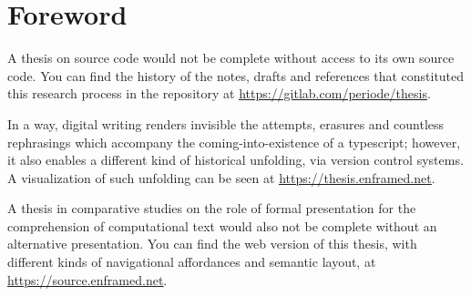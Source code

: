 \section*{Foreword}

A thesis on source code would not be complete without access to its own source code. You can find the history of the notes, drafts and references that constituted this research process in the repository at \underline{\url{https://gitlab.com/periode/thesis}}.

\spacersmall

In a way, digital writing renders invisible the attempts, erasures and countless rephrasings which accompany the coming-into-existence of a typescript; however, it also enables a different kind of historical unfolding, via version control systems. A visualization of such unfolding can be seen at \underline{\url{https://thesis.enframed.net}}.

\spacersmall

A thesis in comparative studies on the role of formal presentation for the comprehension of computational text would also not be complete without an alternative presentation. You can find the web version of this thesis, with different kinds of navigational affordances and semantic layout, at \underline{\url{https://source.enframed.net}}.
